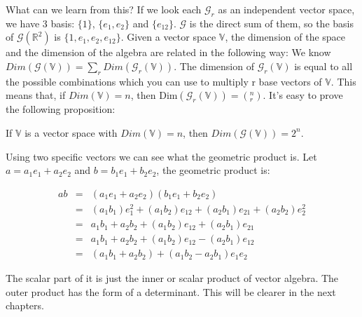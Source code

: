 What can we learn from this? If we look each $\mathcal{G}_r$ as an independent vector space, we have 3 basis: $\{1\}$, $\{e_1, e_2\}$ and $\{e_{12}\}$. $\mathcal{G}$ is the direct sum of them, so the basis of $\mathcal{G}(\mathbb{R}^2)$ is $\{1, e_1, e_2, e_{12}\}$. Given a vector space $\mathbb{V}$, the dimension of the space and the dimension of the algebra are related in the following way: We know $Dim ( \mathcal{G}( \mathbb{V} ) ) = \sum_r Dim ( \mathcal{G}_r(\mathbb{V}) )$. The dimension of $\mathcal{G}_r(\mathbb{V})$ is equal to all the possible combinations which you can use to multiply r base vectors of $\mathbb{V}$. This means that, if $Dim(\mathbb{V}) = n$, then $\mbox{Dim} ( \mathcal{G}_r(\mathbb{V}) )= \left(_r^n\right)$. It's easy to prove the following proposition:

\begin{proposition}
If $\mathbb{V}$ is a vector space with $Dim (\mathbb{V}) = n$, then $Dim (\mathcal{G}(\mathbb{V})) = 2^n$.
\end{proposition}

Using two specific vectors we can see what the geometric product is. Let $a = a_1 e_1 + a_2 e_2$ and $b = b_1 e_1 + b_2 e_2$, the geometric product is:

\begin{eqnarray}
ab & = & (a_1 e_1 + a_2 e_2) (b_1 e_1 + b_2 e_2) \\
& = & (a_1 b_1) e_1^2 + (a_1 b_2) e_{12} + (a_2 b_1) e_{21} + (a_2 b _2) e_2^2 \\
& = & a_1 b_1 + a_2 b_2 + (a_1 b_2) e_{12} + (a_2 b_1) e_{21} \\
& = & a_1 b_1 + a_2 b_2 + (a_1 b_2) e_{12} - (a_2 b_1) e_{12} \\
& = & (a_1 b_1 + a_2 b_2) + (a_1 b_2 - a_2 b_1) e_1 e_2 
\end{eqnarray}

The scalar part of it is just the inner or scalar product of vector algebra. The outer product has the form of a determinant. This will be clearer in the next chapters.























